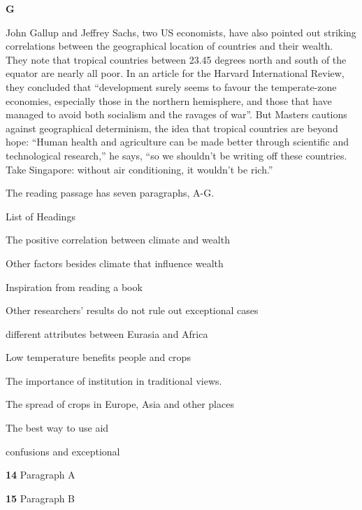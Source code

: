 \documentclass{../templateReading/cdreading}
\begin{document}
\textbf{G}\par

John Gallup and Jeffrey Sachs, two US economists, have also pointed out striking correlations between the geographical location of countries and their wealth. They note that tropical countries between 23.45 degrees north and south of the equator are nearly all poor. In an article for the Harvard International Review, they concluded that “development surely seems to favour the temperate-zone economies, especially those in the northern hemisphere, and those that have managed to avoid both socialism and the ravages of war”. But Masters cautions against geographical determinism, the idea that tropical countries are beyond hope: “Human health and agriculture can be made better through scientific and technological research,” he says, “so we shouldn’t be writing off these countries. Take Singapore: without air conditioning, it wouldn’t be rich.”


The reading passage has seven paragraphs, A-G.



List of Headings

 The positive correlation between climate and wealth

 Other factors besides climate that influence wealth

 Inspiration from reading a book

 Other researchers’ results do not rule out exceptional cases

 different attributes between Eurasia and Africa

 Low temperature benefits people and crops

 The importance of institution in traditional views.

 The spread of crops in Europe, Asia and other places

 The best way to use aid

 confusions and exceptional

\textbf{14} Paragraph A

\textbf{15} Paragraph B
\end{document}
